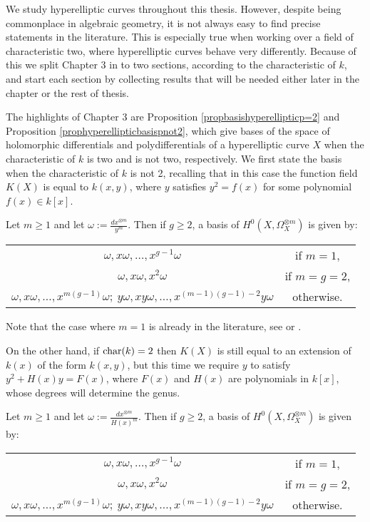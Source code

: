 We study hyperelliptic curves throughout this thesis.
However, despite being commonplace in algebraic geometry, it is not always easy to find precise statements in the literature.
This is especially true when working over a field of characteristic two, where hyperelliptic curves behave very differently.
Because of this we split Chapter $3$ in to two sections, according to the characteristic of $k$, and start each section by collecting results that will be needed either later in the chapter or the rest of thesis.

The highlights of Chapter 3 are Proposition \ref{propbasishyperellipticp=2} and Proposition \ref{prophyperellipticbasispnot2}, which give bases of the space of holomorphic differentials and polydifferentials of a hyperelliptic curve $X$ when the characteristic of $k$ is two and is not two, respectively.
We first state the basis when the characteristic of $k$ is not 2, recalling that in this case the function field $K(X)$ is equal to $k(x,y)$, where $y$ satisfies $y^2 = f(x)$ for some polynomial $f(x) \in k[x]$.
    \begin{unnumprop}
    Let $m\geq 1$ and let $\omega := \frac{dx^{\otimes m}}{y^m}$. 
    Then if $g\geq 2$, a basis of $H^0(X,\Omega_X^{\otimes m})$ is given by:
        {\centering 
        \begin{tabular}{c c}
        $\omega, x\omega, \ldots , x^{g-1}\omega$ &  if $m=1$, \\
        $\omega, x\omega, x^2\omega$  &  if $m=g=2$, \\
        $\omega, x\omega, \ldots, x^{m(g-1)}\omega;\  y\omega, xy\omega, \ldots, x^{(m-1)(g-1)-2}y\omega$ &  otherwise.
        \end{tabular}\par
        }
    \end{unnumprop}
    
Note that the case where $m=1$ is already in the literature, see \cite[Prop. 7.4.26]{liu} or \cite[Ch. IV, \S 4, Prop. 4.3]{griffiths}.
 
On the other hand, if $\operatorname{char}(k) = 2$ then $K(X)$ is still equal to an extension of $k(x)$ of the form $k(x,y)$, but this time we require $y$ to satisfy $y^2 + H(x)y = F(x)$, where $F(x)$ and $H(x)$ are polynomials in $k[x]$, whose degrees will determine the genus.
    \begin{unnumprop}
    Let $m\geq 1$ and let $\omega:= \frac{dx^{\otimes m}}{H(x)^m}$. 
    Then if $g\geq 2$, a basis of $H^0(X,\Omega_X^{\otimes m})$ is given by:\\
        {\centering
        \begin{tabular}{c c}
        $\omega, x\omega, \ldots , x^{g-1}\omega$ &  if $m=1$, \\
        $\omega, x\omega, x^2\omega$ & if $m=g=2$, \\
        $\omega, x\omega, \ldots, x^{m(g-1)}\omega;\  y\omega, xy\omega, \ldots, x^{(m-1)(g-1)-2}y\omega$ & otherwise.
        \end{tabular}\par
        }
    \end{unnumprop}
    
